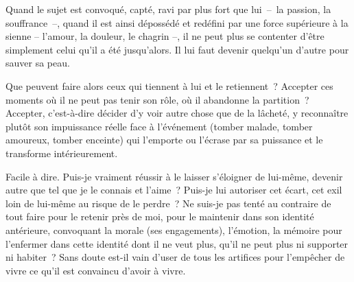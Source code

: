 
	{Quand le sujet est convoqué, capté, ravi par plus fort que lui~–~la passion, la souffrance~–, quand il est ainsi dépossédé et redéfini par une force supérieure à la sienne – l'amour, la douleur, le chagrin –, il ne peut plus se contenter d'être simplement celui qu'il a été jusqu'alors. Il lui faut devenir quelqu'un d'autre pour sauver sa peau.
	
Que peuvent faire alors ceux qui tiennent à lui et le retiennent~? Accepter ces moments où il ne peut pas tenir son rôle, où il abandonne la partition~? Accepter, c'est-à-dire décider d'y voir autre chose que de la lâcheté, y reconnaître plutôt son impuissance réelle face à l'événement (tomber malade, tomber amoureux, tomber enceinte) qui l'emporte ou l'écrase par sa puissance et le transforme intérieurement.

Facile à dire. Puis-je vraiment réussir à le laisser s'éloigner de lui-même, devenir autre que tel que je le connais et l'aime~? Puis-je lui autoriser cet écart, cet exil loin de lui-même au risque de le perdre~? Ne suis-je pas tenté au contraire de tout faire pour le retenir près de moi, pour le maintenir dans son identité antérieure, convoquant la morale (ses engagements), l'émotion, la mémoire pour l'enfermer dans cette identité dont il ne veut plus, qu'il ne peut plus ni supporter ni habiter~? Sans doute est-il vain d'user de tous les artifices pour l'empêcher de vivre ce qu'il est convaincu d'avoir à vivre.

}
